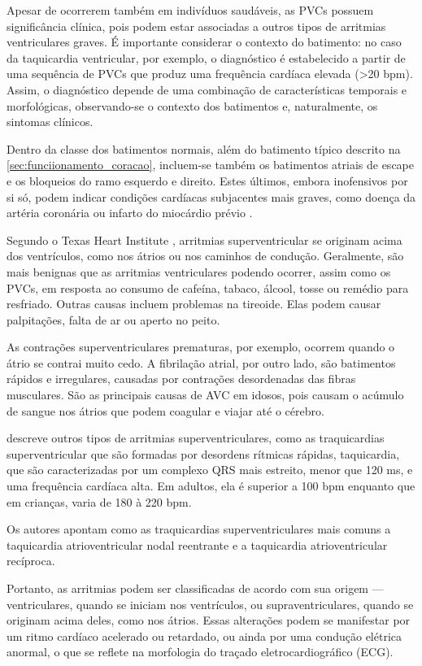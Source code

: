 Apesar de ocorrerem também em indivíduos saudáveis, as PVCs possuem significância clínica, pois podem estar associadas a outros tipos de arritmias ventriculares graves. É importante considerar o contexto do batimento: no caso da taquicardia ventricular, por exemplo, o diagnóstico é estabelecido a partir de uma sequência de PVCs que produz uma frequência cardíaca elevada (>20 bpm). Assim, o diagnóstico depende de uma combinação de características temporais e morfológicas, observando-se o contexto dos batimentos e, naturalmente, os sintomas clínicos.

Dentro da classe dos batimentos normais, além do batimento típico descrito na \ref{sec:funciionamento_coracao}, incluem-se também os batimentos atriais de escape e os bloqueios do ramo esquerdo e direito. Estes últimos, embora inofensivos por si só, podem indicar condições cardíacas subjacentes mais graves, como doença da artéria coronária ou infarto do miocárdio prévio \cite{mitchell2024hisbloqueio}.

Segundo o Texas Heart Institute \cite{texasheart_arrhythmias}, arritmias superventricular se originam acima dos ventrículos, como nos 
átrios ou nos caminhos de condução. Geralmente, são mais benignas que as arritmias ventriculares podendo ocorrer, assim como os PVCs, em 
resposta ao consumo de cafeína, tabaco, álcool, tosse ou remédio para resfriado. Outras causas incluem problemas na tireoide. Elas podem causar
palpitações, falta de ar ou aperto no peito.

As contrações superventriculares prematuras, por exemplo, ocorrem quando o átrio se contrai muito cedo. A fibrilação atrial, por outro lado,
são batimentos rápidos e irregulares, causadas por contrações desordenadas das fibras musculares. São as principais causas de 
AVC em idosos, pois causam o acúmulo de sangue nos átrios que podem coagular e viajar até o cérebro. 

 descreve outros tipos de arritmias superventriculares, como as traquicardias superventricular que são formadas 
por desordens rítmicas rápidas, taquicardia, que são caracterizadas por um complexo QRS mais estreito, menor que 120 ms, e uma 
frequência cardíaca alta. Em adultos, ela é superior a 100 bpm enquanto que em crianças, varia de 180 à 220 bpm. 

Os autores apontam como as traquicardias superventriculares mais comuns a taquicardia atrioventricular nodal reentrante e a taquicardia
atrioventricular recíproca. 

Portanto, as arritmias podem ser classificadas de acordo com sua origem — ventriculares, quando se iniciam nos ventrículos, ou supraventriculares, quando se originam acima deles, como nos átrios.
Essas alterações podem se manifestar por um ritmo cardíaco acelerado ou retardado, ou ainda por uma condução elétrica anormal, o que se reflete na morfologia do traçado eletrocardiográfico (ECG).

